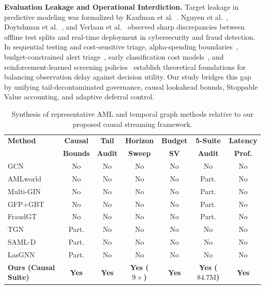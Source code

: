 \documentclass[sigconf,nonacm]{acmart}
\begin{document}
\textbf{Evaluation Leakage and Operational Interdiction.} Target leakage in predictive modeling was formalized by Kaufman et al.~\cite{kaufman2012leakage}. Nguyen et al.~\cite{nguyen2022future}, Doytshman et al.~\cite{doytshman2023fraudability}, and Verlaan et al.~\cite{verlaan2025lasgnn} observed sharp discrepancies between offline test splits and real-time deployment in cybersecurity and fraud detection. In sequential testing and cost-sensitive triage, alpha-spending boundaries~\cite{lan1983alpha}, budget-constrained alert triage~\cite{sharma2023tdap}, early classification cost models~\cite{mori2018early,jeon2025hia}, and reinforcement-learned screening policies~\cite{shen2020dqn,maganti2026liability,vandenbeukel2026tide} establish theoretical foundations for balancing observation delay against decision utility. Our study bridges this gap by unifying tail-decontaminated governance, causal lookahead bounds, Stoppable Value accounting, and adaptive deferral control.

\begin{table}[t]
\centering
\caption{Synthesis of representative AML and temporal graph methods relative to our proposed causal streaming framework.}
\label{tab:lit_comparison}
\scriptsize
\setlength{\tabcolsep}{2.5pt}
\begin{tabular}{lcccccc}
\toprule
\textbf{Method} & \textbf{Causal} & \textbf{Tail} & \textbf{Horizon} & \textbf{Budget} & \textbf{5-Suite} & \textbf{Latency} \\
 & \textbf{Bounds} & \textbf{Audit} & \textbf{Sweep} & \textbf{SV} & \textbf{Audit} & \textbf{Prof.} \\
\midrule
GCN~\cite{weber2019elliptic} & No & No & No & No & No & No \\
AMLworld~\cite{altman2023ibmaml} & No & No & No & No & Part. & No \\
Multi-GIN~\cite{egressy2024multigraph} & No & No & No & No & Part. & No \\
GFP+GBT~\cite{blanusa2024gfp} & No & No & No & No & Part. & No \\
FraudGT~\cite{lin2024fraudgt} & No & No & No & No & Part. & No \\
TGN~\cite{rossi2020tgn} & Part. & No & No & No & No & No \\
SAML-D~\cite{oztas2023samld} & Part. & No & No & No & No & No \\
LasGNN~\cite{verlaan2025lasgnn} & Part. & No & No & No & No & No \\
\midrule
\textbf{Ours (Causal Suite)} & \textbf{Yes} & \textbf{Yes} & \textbf{Yes ($9\times$)} & \textbf{Yes} & \textbf{Yes ($84.7\text{M}$)} & \textbf{Yes} \\
\bottomrule
\end{tabular}
\end{table}
\end{document}
